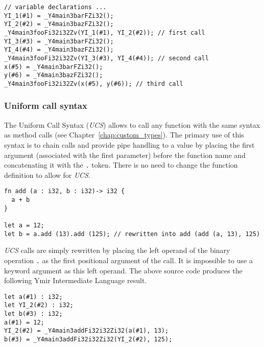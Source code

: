 \begin{lstlisting}[style=intermediateVerb]
// variable declarations ...
YI_1(#1) = _Y4main3barFZi32();
YI_2(#2) = _Y4main3bazFZi32();
_Y4main3fooFi32i32Zv(YI_1(#1), YI_2(#2)); // first call
YI_3(#3) = _Y4main3barFZi32();
YI_4(#4) = _Y4main3bazFZi32();
_Y4main3fooFi32i32Zv(YI_3(#3), YI_4(#4)); // second call
x(#5) = _Y4main3barFZi32();
y(#6) = _Y4main3bazFZi32();
_Y4main3fooFi32i32Zv(x(#5), y(#6)); // third call
\end{lstlisting}

\subsubsection {Uniform call syntax}

The Uniform Call Syntax (\textit{UCS}) allows to call any function with the same
syntax as method calls (see Chapter~\ref{chap:custom_types}). The primary use of
this syntax is to chain calls and provide pipe handling to a value by placing
the first argument (associated with the first parameter) before the function
name and concatenating it with the \texttt{.} token. There is no need to change
the function definition to allow for \textit{UCS}.

\begin{lstlisting}[style=coloredverbatim]
fn add (a : i32, b : i32)-> i32 {
  a + b
}

let a = 12;
let b = a.add (13).add (125); // rewritten into add (add (a, 13), 125)
\end{lstlisting}

\textit{UCS} calls are simply rewritten by placing the left operand of the
binary operation \texttt{.} as the first positional argument of the call. It is
impossible to use a keyword argument as this left operand. The above source code
produces the following Ymir Intermediate Language result.
\smallskip

\begin{lstlisting}[style=intermediateVerb]
let a(#1) : i32;
let YI_2(#2) : i32;
let b(#3) : i32;
a(#1) = 12;
YI_2(#2) = _Y4main3addFi32i32Zi32(a(#1), 13);
b(#3) = _Y4main3addFi32i32Zi32(YI_2(#2), 125);
\end{lstlisting}


